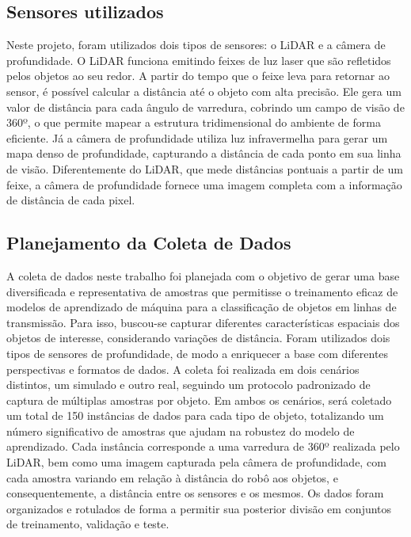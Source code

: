 \subsection{Sensores utilizados}

Neste projeto, foram utilizados dois tipos de sensores: o LiDAR e a câmera de profundidade. O LiDAR funciona emitindo feixes de luz laser que são refletidos pelos objetos ao seu redor. A partir do tempo que o feixe leva para retornar ao sensor, é possível calcular a distância até o objeto com alta precisão. Ele gera um valor de distância para cada ângulo de varredura, cobrindo um campo de visão de 360º, o que permite mapear a estrutura tridimensional do ambiente de forma eficiente. Já a câmera de profundidade utiliza luz infravermelha para gerar um mapa denso de profundidade, capturando a distância de cada ponto em sua linha de visão. Diferentemente do LiDAR, que mede distâncias pontuais a partir de um feixe, a câmera de profundidade fornece uma imagem completa com a informação de distância de cada pixel.

\subsection{Planejamento da Coleta de Dados}

A coleta de dados neste trabalho foi planejada com o objetivo de gerar uma base diversificada e representativa de amostras que permitisse o treinamento eficaz de modelos de aprendizado de máquina para a classificação de objetos em linhas de transmissão. Para isso, buscou-se capturar diferentes características espaciais dos objetos de interesse, considerando variações de distância. Foram utilizados dois tipos de sensores de profundidade, de modo a enriquecer a base com diferentes perspectivas e formatos de dados. A coleta foi realizada em dois cenários distintos, um simulado e outro real, seguindo um protocolo padronizado de captura de múltiplas amostras por objeto. Em ambos os cenários, será coletado um total de 150 instâncias de dados para cada tipo de objeto, totalizando um número significativo de amostras que ajudam na robustez do modelo de aprendizado. Cada instância corresponde a uma varredura de 360º realizada pelo LiDAR, bem como uma imagem capturada pela câmera de profundidade, com cada amostra variando em relação à distância do robô aos objetos, e consequentemente, a distância entre os sensores e os mesmos. Os dados foram organizados e rotulados de forma a permitir sua posterior divisão em conjuntos de treinamento, validação e teste. 

